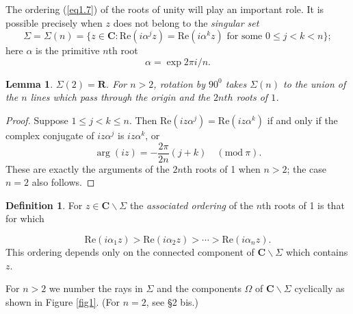\documentclass{surv-l}
\theoremstyle{plain}
\newtheorem{lem}[theorem]{\sc Lemma}
\theoremstyle{definition}
\newtheorem*{defi}{\sc Definition}
\numberwithin{equation}{chapter}
\begin{document}
The ordering (\ref{eq1.7}) of the roots of unity will play an important role. It is possible precisely when $z$ does not belong to the \emph{singular set}
\begin{equation}\label{eq2.4}
\Sigma=\Sigma(n)=\{z\in \mathbf{C}:\mathrm{Re}(i\alpha^{j}z)=\mathrm{Re}(i\alpha^{k}z) \text{ for some } 0\leq j<k<n\};
\end{equation}
here $\alpha$ is the primitive $n$th root
\begin{equation}\label{eq2.5}
\alpha=\exp 2\pi i/n.
\end{equation}
\setcounter{theorem}{5}
\begin{lem}\label{chap01:lem2.6} $\Sigma(2)=\mathbf{R}$. For $n>2$, rotation by $90^{0}$ takes $\Sigma(n)$ to the union of the $n$ lines which pass through the origin and the $2nth$ roots of $1$.
\end{lem}
\begin{proof}
Suppose $1\leq j<k\leq n$. Then $\mathrm{Re}(iz\alpha^{j})=\mathrm{Re}(iz\alpha^{k})$ if and only if the complex conjugate of $iz\alpha^{j}$ is $iz\alpha^{k}$, or
\begin{equation*}
\arg(iz)=-\frac{2\pi}{2n}(j+k)\quad (\mathrm{mod}\ \pi).
\end{equation*}
These are exactly the arguments of the $2n$th roots of 1 when $n>2$; the case $n =2$ also follows.
\end{proof}

\begin{defi}
For $ z\in \mathbf{C}\backslash \Sigma$ the \emph{associated ordering} of the $n$th roots of 1 is that for which
\end{defi}
\setcounter{equation}{6}
\begin{equation}\label{eq2.7}
\mathrm{Re}(i\alpha_{1}z)>\mathrm{Re}(i\alpha_{2}z)>\cdots >\mathrm{Re}(i\alpha_{n}z).
\end{equation}
This ordering depends only on the connected component of $ \mathbf{C}\backslash \Sigma$ which contains $z$.

For $n>2$ we number the rays in $\Sigma$ and the components $\Omega$ of $ \mathbf{C}\backslash \Sigma$ cyclically as shown in Figure \ref{fig1}. (For $n=2$, see \S2 bis.)
\end{document}
